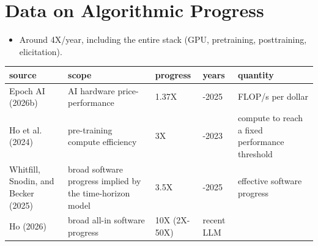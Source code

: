 \documentclass[
  11pt,
  letterpaper,
  DIV=11,
  numbers=noendperiod]{scrartcl}
\providecommand{\tightlist}{%
  \setlength{\itemsep}{0pt}\setlength{\parskip}{0pt}}
\begin{document}
\section{Data on Algorithmic
Progress}\label{data-on-algorithmic-progress}

\begin{description}
\tightlist
\item[Best estimates.]
\hfill
\begin{itemize}
\tightlist
\item
  Around 4X/year, including the entire stack (GPU, pretraining,
  posttraining, elicitation).
\end{itemize}
\end{description}

\begin{longtable}[]{@{}
  >{\raggedright\arraybackslash}p{}
  >{\raggedright\arraybackslash}p{}
  >{\raggedright\arraybackslash}p{}
  >{\raggedright\arraybackslash}p{}
  >{\raggedright\arraybackslash}p{}@{}}
\toprule\noalign{}
\begin{minipage}[b]{\linewidth}\raggedright
source
\end{minipage} & \begin{minipage}[b]{\linewidth}\raggedright
scope
\end{minipage} & \begin{minipage}[b]{\linewidth}\raggedright
progress
\end{minipage} & \begin{minipage}[b]{\linewidth}\raggedright
years
\end{minipage} & \begin{minipage}[b]{\linewidth}\raggedright
quantity
\end{minipage} \\
\midrule\noalign{}
\endhead
\bottomrule\noalign{}
\endlastfoot
Epoch AI (2026b) & AI hardware price-performance & 1.37X & 2012-2025 &
FLOP/s per dollar \\
Ho et al. (2024) & pre-training compute efficiency & 3X & 2012-2023 &
compute to reach a fixed performance threshold \\
Whitfill, Snodin, and Becker (2025) & broad software progress implied by
the time-horizon model & 3.5X & 2019-2025 & effective software
progress \\
Ho (2026) & broad all-in software progress & 10X (2X-50X) & recent LLM

\end{longtable}
\end{document}
